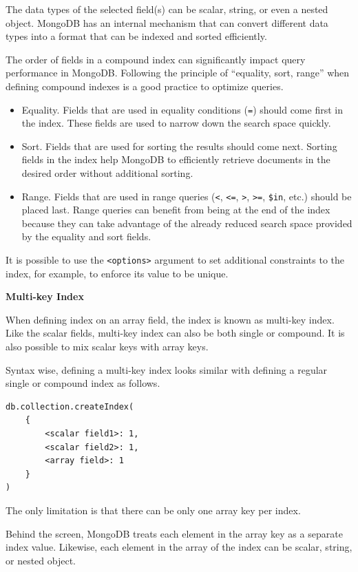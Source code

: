 The data types of the selected field(s) can be scalar, string, or even a nested object. MongoDB has an internal mechanism that can convert different data types into a format that can be indexed and sorted efficiently.

The order of fields in a compound index can significantly impact query performance in MongoDB. Following the principle of ``equality, sort, range'' when defining compound indexes is a good practice to optimize queries.

\begin{itemize}
	\item Equality. Fields that are used in equality conditions (\verb|=|) should come first in the index. These fields are used to narrow down the search space quickly.
	\item Sort. Fields that are used for sorting the results should come next. Sorting fields in the index help MongoDB to efficiently retrieve documents in the desired order without additional sorting.
	\item Range. Fields that are used in range queries (\verb|<|, \verb|<=|, \verb|>|, \verb|>=|, \verb|$in|, etc.) should be placed last. Range queries can benefit from being at the end of the index because they can take advantage of the already reduced search space provided by the equality and sort fields.
\end{itemize}

It is possible to use the \verb|<options>| argument to set additional constraints to the index, for example, to enforce its value to be unique.

\vspace{0.1in}
\noindent \textbf{Multi-key Index}
\vspace{0.1in}

When defining index on an array field, the index is known as multi-key index. Like the scalar fields, multi-key index can also be both single or compound. It is also possible to mix scalar keys with array keys.

Syntax wise, defining a multi-key index looks similar with defining a regular single or compound index as follows.
\begin{lstlisting}
db.collection.createIndex(
	{
		<scalar field1>: 1,
		<scalar field2>: 1,
		<array field>: 1
	}
)
\end{lstlisting}
The only limitation is that there can be only one array key per index.

Behind the screen, MongoDB treats each element in the array key as a separate index value. Likewise, each element in the array of the index can be scalar, string, or nested object.

